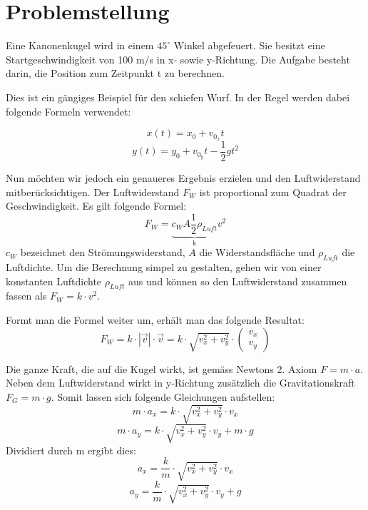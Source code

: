 \section{Problemstellung
\label{perturbation:section:problemstellung}}
Eine Kanonenkugel wird in einem $45^{\circ}$ Winkel abgefeuert. 
Sie besitzt eine Startgeschwindigkeit von 100 m/s in x- sowie y-Richtung. 
Die Aufgabe besteht darin, die Position zum Zeitpunkt t zu berechnen.

Dies ist ein gängiges Beispiel für den schiefen Wurf. 
In der Regel werden dabei folgende Formeln verwendet:

\begin{equation}\label{eq:x_simple}
    x(t) = x_0 + v_{0_x}t
\end{equation}
\begin{equation}\label{eq:y_simple}
    y(t) = y_0 + v_{0_y}t - \frac{1}{2}gt^2
\end{equation}


Nun möchten wir jedoch ein genaueres Ergebnis erzielen und den Luftwiderstand mitberücksichtigen.  
Der Luftwiderstand $F_W$ ist proportional zum Quadrat der Geschwindigkeit. Es gilt folgende Formel:
\[
F_W = \underbrace{c_WA\frac{1}{2}\rho_{Luft}}_\text{k}v^2
\]
$c_W$ bezeichnet den Strömungswiderstand, $A$ die Widerstandsfläche und $\rho_{Luft}$ die Luftdichte. 
Um die Berechnung simpel zu gestalten, gehen wir von einer konstanten Luftdichte $\rho_{Luft}$ aus und können so den Luftwiderstand zusammen fassen als $F_W = k \cdot v^2$.

Formt man die Formel weiter um, erhält man das folgende Resultat:
\[
F_W = k \cdot |\vec{v}| \cdot \vec{v} = k \cdot \sqrt{v_x^2 + v_y^2} \cdot \begin{pmatrix}v_x\\v_y\end{pmatrix}
\]

Die ganze Kraft, die auf die Kugel wirkt, ist gemäss Newtons 2. Axiom $F = m \cdot a$. 
Neben dem Luftwiderstand wirkt in y-Richtung zusätzlich die Gravitationskraft $F_G = m \cdot g$. 
Somit lassen sich folgende Gleichungen aufstellen:
\[
m \cdot a_x = k \cdot \sqrt{v_x^2 + v_y^2} \cdot v_x
\]
\[
m \cdot a_y = k \cdot \sqrt{v_x^2 + v_y^2} \cdot v_y + m \cdot g
\]
Dividiert durch m ergibt dies:
\[
a_x = \frac{k}{m} \cdot \sqrt{v_x^2 + v_y^2} \cdot v_x
\]
\[
a_y = \frac{k}{m} \cdot \sqrt{v_x^2 + v_y^2} \cdot v_y + g
\]

